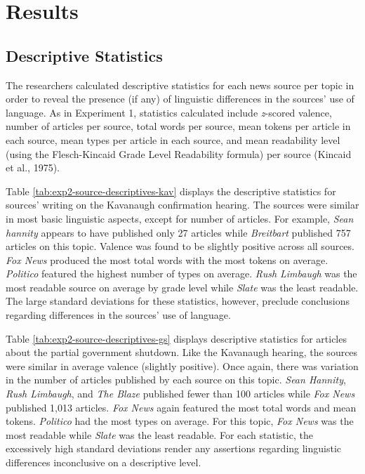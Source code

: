 \documentclass[english,,man]{apa6}
\begin{document}
\section{Results}\label{results-1}

\subsection{Descriptive Statistics}\label{descriptive-statistics-1}

The researchers calculated descriptive statistics for each news source
per topic in order to reveal the presence (if any) of linguistic
differences in the sources' use of language. As in Experiment 1,
statistics calculated include \emph{z}-scored valence, number of
articles per source, total words per source, mean tokens per article in
each source, mean types per article in each source, and mean readability
level (using the Flesch-Kincaid Grade Level Readability formula) per
source (Kincaid et al., 1975).

Table \ref{tab:exp2-source-descriptives-kav} displays the descriptive
statistics for sources' writing on the Kavanaugh confirmation hearing.
The sources were similar in most basic linguistic aspects, except for
number of articles. For example, \emph{Sean hannity} appears to have
published only 27 articles while \emph{Breitbart} published 757 articles
on this topic. Valence was found to be slightly positive across all
sources. \emph{Fox News} produced the most total words with the most
tokens on average. \emph{Politico} featured the highest number of types
on average. \emph{Rush Limbaugh} was the most readable source on average
by grade level while \emph{Slate} was the least readable. The large
standard deviations for these statistics, however, preclude conclusions
regarding differences in the sources' use of language.

Table \ref{tab:exp2-source-descriptives-gs} displays descriptive
statistics for articles about the partial government shutdown. Like the
Kavanaugh hearing, the sources were similar in average valence (slightly
positive). Once again, there was variation in the number of articles
published by each source on this topic. \emph{Sean Hannity}, \emph{Rush
Limbaugh}, and \emph{The Blaze} published fewer than 100 articles while
\emph{Fox News} published 1,013 articles. \emph{Fox News} again featured
the most total words and mean tokens. \emph{Politico} had the most types
on average. For this topic, \emph{Fox News} was the most readable while
\emph{Slate} was the least readable. For each statistic, the excessively
high standard deviations render any assertions regarding linguistic
differences inconclusive on a descriptive level.
\end{document}

